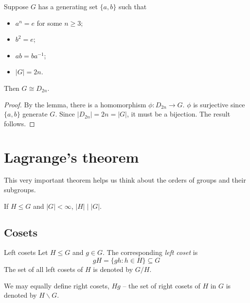 \documentclass{../../template/note}
\begin{document}
    \begin{proposition}
        Suppose \(G\) has a generating set \(\{a, b\}\) such that
        \begin{itemize}
            \item \(a^n = e\) for some \(n \geq 3\);
            \item \(b^2 = e\);
            \item \(ab = ba^{-1}\);
            \item \(|G| = 2n\).
        \end{itemize}
        Then \(G \cong D_{2n}\).
    \end{proposition}
    
    \begin{proof}
        By the lemma, there is a homomorphism \(\phi: D_{2n} \to G\). \(\phi\) is surjective since \(\{a, b\}\) generate \(G\). Since \(|D_{2n}| = 2n = |G|\), it must be a bijection. The result follows.
    \end{proof}
    
    
    
    



    \section{Lagrange's theorem}

    This very important theorem helps us think about the orders of groups and their subgroups.

    \begin{theorem}[Lagrange]
        If \(H \leq G\) and \(|G| < \infty\), \(|H| \mid |G|\).
    \end{theorem}
    
    \subsection{Cosets}

    \begin{definition}{Left cosets}
        Let \(H \leq G\) and \(g \in G\). The corresponding \emph{left coset} is
        \[
            gH = \{gh : h \in H\} \subseteq G
        \]
        The set of all left cosets of \(H\) is denoted by \(G/H\).
    \end{definition}
    
    \begin{remark*}
        We may equally define right cosets, \(Hg\) -- the set of right cosets of \(H\) in \(G\) is denoted by \(H \backslash G\).
    \end{remark*}
    
\end{document}
